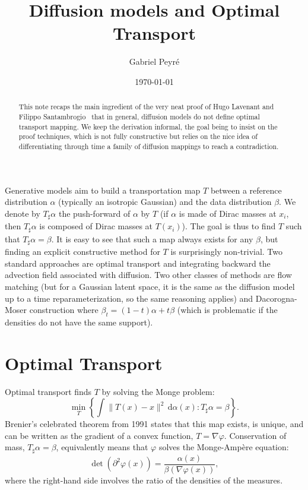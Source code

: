 \documentclass{article}
\title{Diffusion models and Optimal Transport}
\author{Gabriel Peyr\'e}
\date{\today}
\begin{document}
\maketitle

\begin{abstract}
	This note recaps the main ingredient of the very neat proof of Hugo Lavenant and Filippo Santambrogio~\cite{LavenantSantambrogio20} that in general, diffusion models do not define optimal transport mapping. We keep the derivation informal, the goal being to insist on the proof techniques, which is not fully constructive but relies on the nice idea of differentiating through time a family of diffusion mappings to reach a contradiction.
\end{abstract}

Generative models aim to build a transportation map $T$ between a reference distribution $\alpha$ (typically an isotropic Gaussian) and the data distribution $\beta$.
%
We denote by $T_\sharp \alpha$ the push-forward of $\alpha$ by $T$ (if $\alpha$ is made of Dirac masses at $x_i$, then $T_\sharp \alpha$ is composed of Dirac masses at $T(x_i)$). The goal is thus to find $T$ such that $T_\sharp \alpha = \beta$.
%
It is easy to see that such a map always exists for any $\beta$, but finding an explicit constructive method for $T$ is surprisingly non-trivial. Two standard approaches are optimal transport and integrating backward the advection field associated with diffusion. Two other classes of methods are flow matching (but for a Gaussian latent space, it is the same as the diffusion model up to a time reparameterization, so the same reasoning applies) and Dacorogna-Moser construction where $\beta_t = (1-t)\alpha+t \beta$ (which is problematic if the densities do not have the same support). 

\section{Optimal Transport}

Optimal transport finds $T$ by solving the Monge problem:
\begin{equation}\label{eq:monge}
    \min_T \left\{ \int \|T(x) - x\|^2 \, \mathrm{d}\alpha(x) : T_\sharp \alpha = \beta \right\}. 
\end{equation}
Brenier's celebrated theorem from 1991 states that this map exists, is unique, and can be written as the gradient of a convex function, $T = \nabla \varphi$. Conservation of mass, $T_\sharp \alpha = \beta$, equivalently means that $\varphi$ solves the Monge-Ampère equation:
\begin{equation}\label{eq:monge-ampere}
    \det(\partial^2 \varphi(x)) = \frac{\alpha(x)}{\beta(\nabla \varphi(x))}, 
\end{equation}
where the right-hand side involves the ratio of the densities of the measures. 
\end{document}
